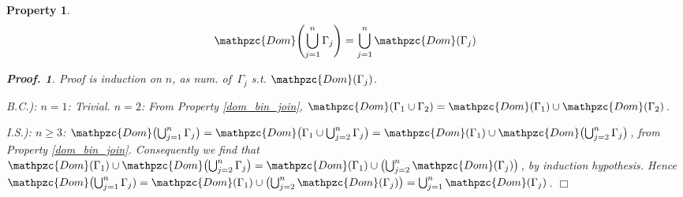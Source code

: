 \documentclass[12pt]{article}
\newtheorem{Property}{Property}[section]
\newtheorem{Proof}{Proof.}
\begin{document}
\begin{Property} \label{dom_mul_join}
  \[ \mathpzc{Dom}\Biggl(\bigcup_{j=1}^{n} \Gamma_j \Biggr) =
      \bigcup_{j=1}^{n} \mathpzc{Dom}(\Gamma_j)
  \]
  \begin{Proof}
    Proof is induction on $n$, as num. of
    $\, \Gamma_j$ s.t. $\mathpzc{Dom}(\Gamma_j)$.
    
    B.C.): $n = 1$: Trivial.
    $n = 2$: From Property \ref{dom_bin_join},
    $\mathpzc{Dom}(\Gamma_1 \cup \Gamma_2) = \mathpzc{Dom}(\Gamma_1) \cup
    \mathpzc{Dom}(\Gamma_2)$.
    
    I.S.): $n \ge 3$: $\mathpzc{Dom}\bigl(\bigcup_{j=1}^{n} \Gamma_j \bigr)
    = \mathpzc{Dom}\bigl(\Gamma_1 \cup \bigcup_{j=2}^{n} \Gamma_j \bigr) =
    \mathpzc{Dom}(\Gamma_1) \cup \mathpzc{Dom}\bigl(
    \bigcup_{j=2}^{n} \Gamma_j \bigr)$, from Property \ref{dom_bin_join}.
    Consequently we find that $\mathpzc{Dom}(\Gamma_1) \cup
    \mathpzc{Dom}\bigl(\bigcup_{j=2}^{n} \Gamma_j \bigr) =
    \mathpzc{Dom}(\Gamma_1) \cup \bigl(\bigcup_{j=2}^{n}
    \mathpzc{Dom}(\Gamma_j) \bigr)$, by induction hypothesis. Hence
    $\mathpzc{Dom}\bigl(\bigcup_{j=1}^{n} \Gamma_j) =
    \mathpzc{Dom}(\Gamma_1) \cup
    \bigl(\bigcup_{j=2}^{n} \mathpzc{Dom}(\Gamma_j) \bigr) =
    \bigcup_{j=1}^{n} \mathpzc{Dom}(\Gamma_j)$.
    $\Box$
  \end{Proof}
\end{Property}
\end{document}

